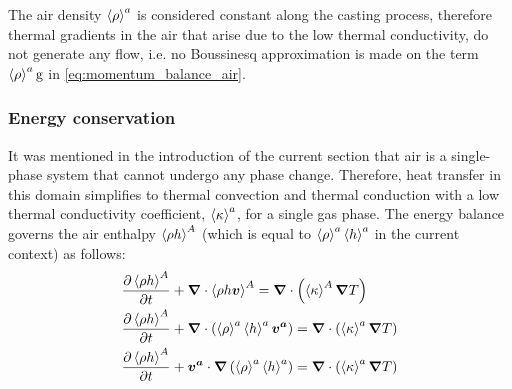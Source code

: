 The air density $\left \langle \rho \right \rangle^a$ is considered constant along the casting process, 
therefore thermal gradients in the air that arise due to the low
thermal conductivity, do not generate any flow, i.e. no Boussinesq approximation 
is made on the term $\left \langle \rho \right \rangle^a \boldsymbol{\text{g}}$ in \cref{eq:momentum_balance_air}.


\subsubsection{Energy conservation}

It was mentioned in the introduction of the current section that air is a single-phase system
that cannot undergo any phase change. Therefore, heat transfer in this domain simplifies to thermal convection
and thermal conduction with a low thermal conductivity coefficient, $\left \langle \kappa \right \rangle^a$, for a single gas phase.
The energy balance governs the air enthalpy $\left \langle \rho h \right \rangle^A$ (which is equal to $\left \langle \rho \right \rangle^a \left \langle h \right \rangle^a$ 
in the current context) as follows:
\begin{subequations}
\begin{align}
	& \tempup{\avg{\rho h}^A} + \nabvec \cdot \avg{\rho h \vec{v}}^A 
	= \nabvec  \cdot \brac{\avg{\kappa}^A \nabvec T } \\
	& \tempup{\avg{\rho h}^A} + \nabvec \cdot \brac{ \rhoa \ha \va} 
	= \nabvec  \cdot \brac{\ka\nabvec T } \\
	\label{eq:energy_balance_air}
	& \tempup{\avg{\rho h}^A}
		+ \va \cdot \nabvec \brac{\rhoa \ha}
		= \nabvec  \cdot \brac{\ka\nabvec T }
\end{align}
\end{subequations}

